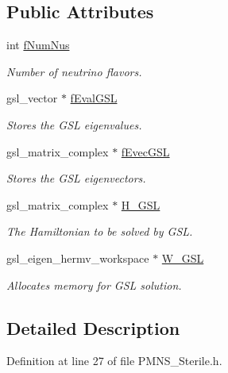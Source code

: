 \subsection*{Public Attributes}
\begin{DoxyCompactItemize}
\item 
int \hyperlink{structOscProb_1_1GSL__EinSys_abb8928986203b5904d078f4f4e337a99}{f\+Num\+Nus}
\begin{DoxyCompactList}\small\item\em Number of neutrino flavors. \end{DoxyCompactList}\item 
gsl\+\_\+vector $\ast$ \hyperlink{structOscProb_1_1GSL__EinSys_af69688ebfa983199ae54513628658b4d}{f\+Eval\+G\+SL}
\begin{DoxyCompactList}\small\item\em Stores the G\+SL eigenvalues. \end{DoxyCompactList}\item 
gsl\+\_\+matrix\+\_\+complex $\ast$ \hyperlink{structOscProb_1_1GSL__EinSys_a91ee7084c424d7a92b5001931e036fd6}{f\+Evec\+G\+SL}
\begin{DoxyCompactList}\small\item\em Stores the G\+SL eigenvectors. \end{DoxyCompactList}\item 
gsl\+\_\+matrix\+\_\+complex $\ast$ \hyperlink{structOscProb_1_1GSL__EinSys_a853e4eae015326445776f9ad7e17e513}{H\+\_\+\+G\+SL}
\begin{DoxyCompactList}\small\item\em The Hamiltonian to be solved by G\+SL. \end{DoxyCompactList}\item 
gsl\+\_\+eigen\+\_\+hermv\+\_\+workspace $\ast$ \hyperlink{structOscProb_1_1GSL__EinSys_a366b813a541dcfbaad2ac3d096f31aa1}{W\+\_\+\+G\+SL}
\begin{DoxyCompactList}\small\item\em Allocates memory for G\+SL solution. \end{DoxyCompactList}\end{DoxyCompactItemize}


\subsection{Detailed Description}


Definition at line 27 of file P\+M\+N\+S\+\_\+\+Sterile.\+h.



